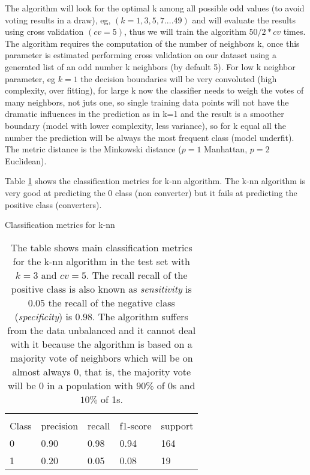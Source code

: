 \documentclass[11pt]{article}
\theoremstyle{definition}
\theoremstyle{remark}
\begin{document}
The algorithm will look for the optimal k among all possible odd values (to avoid voting results in a draw), eg, $(k=1,3,5,7....49)$ and will evaluate the results using cross validation $(cv=5)$, thus we will train the algorithm $50/2*cv$ times. 
The algorithm requires the computation of the number of neighbors k, once this parameter is estimated performing cross validation on our dataset using a generated list of an odd number k neighbors (by default 5). For low k neighbor parameter, eg $k=1$ the decision boundaries will be very convoluted (high complexity, over fitting), for large k now the classifier needs to weigh the votes of many neighbors, not juts one, so single training data points will not have the dramatic influences in the prediction as in k=1 and the result is a smoother boundary (model with lower complexity, less variance), so for k equal all the number the prediction will be always the most frequent class (model underfit). The metric distance is the Minkowski distance ($p=1$ Manhattan, $p=2$ Euclidean).


Table \ref{tab:knn} shows the classification metrics for k-nn algorithm. The k-nn algorithm is very good at predicting the 0 class (non converter) but it fails at predicting the positive class (converters).
\begin{table}[H]
\caption{Classification metrics for k-nn} 
\begin{center} 
\begin{tabular}{lllll}
\hline
\multicolumn{1}{c}{} \\
Class & precision & recall & f1-score & support     \\
\hline
0 & 0.90  &    0.98   &   0.94   &    164 \\
1 & 0.20  &    0.05   &   0.08   &     19 \\
\hline
\end{tabular}
\caption{The table shows  main classification metrics for the k-nn algorithm in the test set with $k=3$ and $cv=5$. The recall recall of the positive class is also known as \emph{sensitivity} is 0.05 the  recall of the negative class (\emph{specificity}) is 0.98. The algorithm suffers from the data unbalanced and it cannot deal with it because the algorithm is based on a majority vote of neighbors which will be on almost always 0, that is, the majority vote will be 0 in a population with $90\%$ of 0s and $10\%$ of 1s.} \label{tab:knn} 
\end{center}
\end{table}
\end{document}
